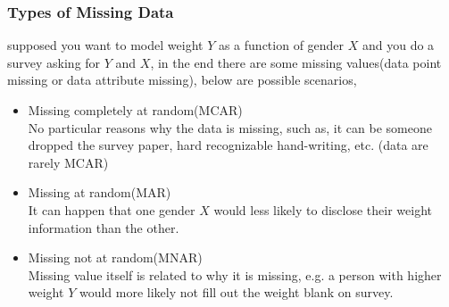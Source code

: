 \documentclass{beamer}
\begin{document}
\begin{frame}
\frametitle{Types of Missing Data}

supposed you want to model weight $Y$ as a function of gender $X$ and you do a survey asking for $Y$ and $X$, in the end there are some missing values(data point missing or data attribute missing), below are possible scenarios,
\begin{itemize}
\item{Missing completely at random(MCAR)}\\
No particular reasons why the data is missing, such as, it can be someone dropped the survey paper, hard recognizable hand-writing, etc. (data are rarely MCAR) 
\item{Missing at random(MAR)}\\
It can happen that one gender $X$ would less likely to disclose their weight information than the other.
\item{Missing not at random(MNAR)}\\
Missing value itself is related to why it is missing, e.g. a person with higher weight $Y$ would more likely not fill out the weight blank on survey. 
\end{itemize}
\end{frame}

\end{document}
